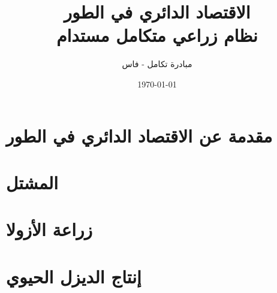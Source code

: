 \documentclass[12pt,a4paper]{report}
\title{الاقتصاد الدائري في الطور\\
\large نظام زراعي متكامل مستدام}
\author{مبادرة تكامل - فاس}
\date{\today}
\begin{document}
\maketitle

\frontmatter
\tableofcontents
\clearpage

\mainmatter

\chapter{مقدمة عن الاقتصاد الدائري في الطور}


\chapter{المشتل}









\chapter{زراعة الأزولا}









\chapter{إنتاج الديزل الحيوي}








\end{document}
